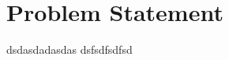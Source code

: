 \renewcommand{\baselinestretch}{1.5}\normalsize
\chapter{Problem Statement}


\label{Chapter Problem Statement}

dsdasdadasdas
dsfsdfsdfsd